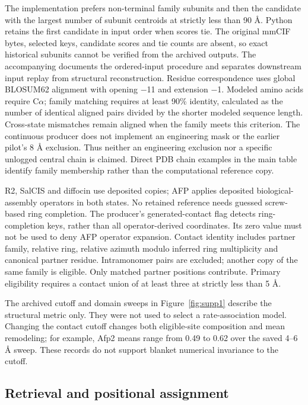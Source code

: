 The implementation prefers non-terminal family subunits and then the candidate with the largest number of subunit centroids at strictly less than 90 \AA{}. Python  retains the first candidate in input order when scores tie. The original mmCIF bytes, selected keys, candidate scores and tie counts are absent, so exact historical subunits cannot be verified from the archived outputs. The accompanying  documents the ordered-input procedure and separates downstream input replay from structural reconstruction. Residue correspondence uses global BLOSUM62 alignment with opening \ensuremath{-}11 and extension \ensuremath{-}1. Modeled amino acids require C\ensuremath{\alpha}; family matching requires at least 90\% identity, calculated as the number of identical aligned pairs divided by the shorter modeled sequence length. Cross-state mismatches remain aligned when the family meets this criterion. The continuous producer does not implement an engineering mask or the earlier pilot's 8 \AA{} exclusion. Thus neither an engineering exclusion nor a specific unlogged central chain is claimed. Direct PDB chain examples in the main table identify family membership rather than the computational reference copy.

R2, SalCIS and diffocin use deposited copies; AFP applies deposited biological-assembly operators in both states. No retained reference needs guessed screw-based ring completion. The producer's generated-contact flag detects ring-completion keys, rather than all operator-derived coordinates. Its zero value must not be used to deny AFP operator expansion. Contact identity includes partner family, relative ring, relative azimuth modulo inferred ring multiplicity and canonical partner residue. Intramonomer pairs are excluded; another copy of the same family is eligible. Only matched partner positions contribute. Primary eligibility requires a contact union of at least three at strictly less than 5 \AA{}.

The archived cutoff and domain sweeps in Figure~\ref{fig:supp1} describe the structural metric only. They were not used to select a rate-association model. Changing the contact cutoff changes both eligible-site composition and mean remodeling; for example, Afp2 means range from 0.49 to 0.62 over the saved 4--6 \AA{} sweep. These records do not support blanket numerical invariance to the cutoff.

\subsection{Retrieval and positional assignment}

